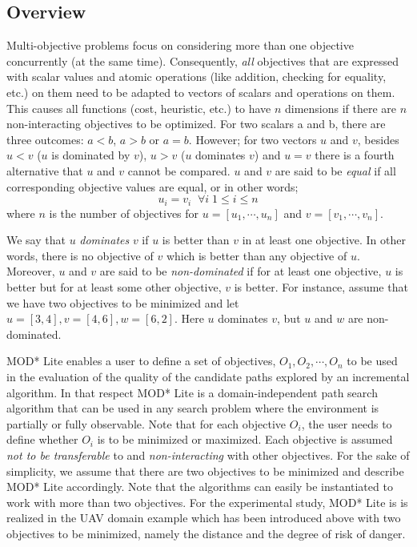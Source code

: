 \documentclass[10pt,journal]{IEEEtran}
\begin{document}
\subsection{Overview}
Multi-objective problems focus on considering more than one objective concurrently (at the same time). Consequently, \textit{all} objectives that are expressed with scalar values and atomic operations (like addition, checking for equality, etc.) on them need to be adapted to vectors of scalars and operations on them. This causes all functions (cost, heuristic, etc.) to have $n$ dimensions if there are $n$ non-interacting objectives to be optimized. For two scalars a and b, there are three outcomes: $a<b$, $a>b$ or $a=b$. However; for two vectors $u$ and $v$, besides $u<v$ ($u$ is dominated by $v$), $u>v$ ($u$ dominates $v$) and $u=v$ there is a fourth alternative that $u$ and $v$ cannot be compared. $u$ and $v$ are said to be \textit{equal} if all corresponding objective values are equal, or in other words;
\[ u_{i} = v_{i} \;\; \forall i \; 1 \leq i \leq n	  \] where $n$ is the number of objectives for $u=[u_1, \cdots, u_n]$ and $v=[v_1,\cdots,v_n]$. 

We say that $u$ \textit{dominates} $v$ if $u$ is better than $v$ in at least one objective. In other words, there is no objective of $v$ which is better than any objective of $u$. Moreover, $u$ and $v$ are said to be \textit{non-dominated} if for at least one objective,  $u$ is better but for at least some other objective, $v$ is better. For instance, assume that we have two objectives to be minimized and let $u=[3,4], v=[4,6], w=[6,2] $. Here $u$ dominates $v$, but $u$ and $w$ are non-dominated.

MOD* Lite enables a user to define a set of objectives, $O_1, O_2, \cdots, O_n$ to be used in the evaluation of the quality of the candidate paths explored by an incremental algorithm. In that respect MOD* Lite is a domain-independent path search algorithm that can be used in any search problem where the environment is partially or fully observable. Note that for each objective $O_i$, the user needs to define whether $O_i$ is to be minimized or maximized. Each objective is assumed \textit{not to be transferable} to and \textit{non-interacting} with other objectives.  For the sake of simplicity, we assume that there are two objectives to be minimized and describe MOD* Lite accordingly. Note that the algorithms can easily be instantiated to work with more than two objectives. For the experimental study, MOD* Lite is is realized in the UAV domain example which has been introduced above with two objectives to be minimized, namely the distance and the degree of risk of danger. 
\end{document}
